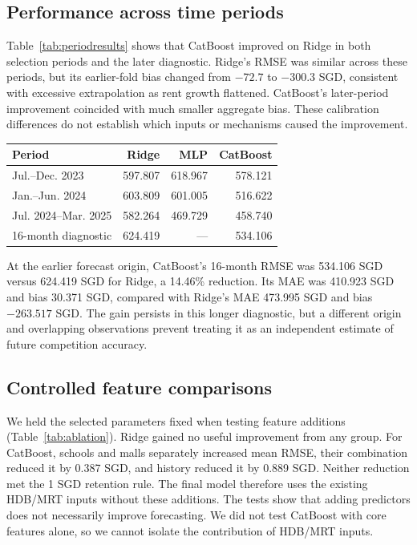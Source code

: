 \documentclass[conference]{IEEEtran}
\makeatletter
\newenvironment{localtable}{\par\addvspace{\medskipamount}\noindent
  \begin{minipage}{\columnwidth}\def\@captype{table}}{\end{minipage}\par
  \addvspace{\medskipamount}}
\makeatother
\begin{document}
\subsection{Performance across time periods}
Table~\ref{tab:periodresults} shows that CatBoost improved on Ridge in both
selection periods and the later diagnostic. Ridge's RMSE was similar across
these periods, but its earlier-fold bias changed from $-72.7$ to $-300.3$
SGD, consistent with excessive extrapolation as rent growth flattened.
CatBoost's later-period improvement coincided with much smaller aggregate
bias. These calibration differences do not establish which inputs or mechanisms
caused the improvement.

\begin{localtable}
  \caption{RMSE (SGD) by evaluation period. The final row overlaps the others.}
  \label{tab:periodresults}
  \centering\small
  \begin{tabularx}{\columnwidth}{Xrrr}
    \toprule
    Period & Ridge & MLP & CatBoost \\
    \midrule
    Jul.--Dec. 2023 & 597.807 & 618.967 & 578.121 \\
    Jan.--Jun. 2024 & 603.809 & 601.005 & 516.622 \\
    Jul. 2024--Mar. 2025 & 582.264 & 469.729 & 458.740 \\
    16-month diagnostic & 624.419 & --- & 534.106 \\
    \bottomrule
  \end{tabularx}
\end{localtable}

At the earlier forecast origin, CatBoost's 16-month RMSE was 534.106 SGD
versus 624.419 SGD for Ridge, a 14.46\% reduction. Its MAE was 410.923 SGD
and bias 30.371 SGD, compared with Ridge's MAE 473.995 SGD and bias
$-263.517$ SGD. The gain persists in this longer diagnostic, but a different
origin and overlapping observations prevent treating it as an independent
estimate of future competition accuracy.

\subsection{Controlled feature comparisons}
\label{sec:ablation}
We held the selected parameters fixed when testing feature additions
(Table~\ref{tab:ablation}). Ridge gained no useful improvement from any group.
For CatBoost, schools and malls separately increased mean RMSE, their
combination reduced it by 0.387 SGD, and history reduced it by 0.889 SGD.
Neither reduction met the 1 SGD retention rule. The final model therefore uses the existing HDB/MRT inputs without these
additions. The tests show that adding predictors does not necessarily
improve forecasting. We did not test CatBoost with core features alone,
so we cannot isolate the contribution of HDB/MRT inputs.
\end{document}

